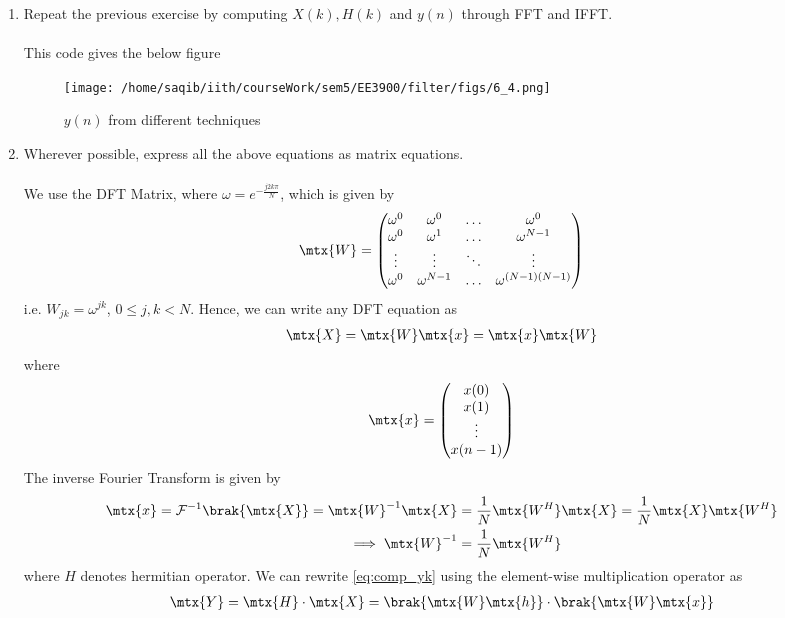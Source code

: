 \documentclass[journal,12pt,twocolumn]{IEEEtran}
\renewcommand\thesection{\arabic{section}}
\begin{document}
\begin{enumerate}[label=\thesection.\arabic*]
\item Repeat the previous exercise by computing $X(k), H(k)$ and $y(n)$ through FFT and 
IFFT.
\\\solution\\

This code gives the below figure
\begin{figure}[!ht]
	\centering
	\texttt{[image: /home/saqib/iith/courseWork/sem5/EE3900/filter/figs/6\_4.png]}
	\caption{$y(n)$ from different techniques}
	\label{fig:yndft}
	\end{figure}
\item Wherever possible, express all the above equations as matrix equations.
\\\solution\\
We use the DFT Matrix, where $\omega = e^{-\frac{j2k\pi}{N}}$, which is given by
\begin{align}
	\mtx{W} = 
	\begin{pmatrix}
		\omega^0 & \omega^0 & \ldots & \omega^0 \\
		\omega^0 & \omega^1 & \ldots & \omega^{N - 1} \\
		\vdots & \vdots & \ddots & \vdots \\
		\omega^0 & \omega^{N - 1} & \ldots & \omega^{(N -1)(N - 1)}
	\end{pmatrix}
\end{align}
i.e. $W_{jk} = \omega^{jk}$, $0 \leq j, k < N$. Hence, we can write any DFT equation as
\begin{align}
	\mtx{X} = \mtx{W}\mtx{x} = \mtx{x}\mtx{W}
\end{align}
\noindent where
\begin{align}
	\mtx{x} = 
	\begin{pmatrix}
		x(0) \\ x(1) \\ \vdots \\ x(n - 1)
	\end{pmatrix}
\end{align}
The inverse Fourier Transform is given by
\begin{align}
	\mtx{x} = \mathcal{F}^{-1}\brak{\mtx{X}} = \mtx{W}^{-1}\mtx{X} &= 
	\frac{1}{N}\mtx{W^{H}}\mtx{X} = \frac{1}{N}\mtx{X}\mtx{W^{H}} \\ 
	\implies \mtx{W}^{-1} &= \frac{1}{N}\mtx{W^{H}}
\end{align}
 where $H$ denotes hermitian operator. We can rewrite \eqref{eq:comp_yk} using the
element-wise multiplication operator as
\begin{align}
	\mtx{Y} = \mtx{H}\cdot\mtx{X} = \brak{\mtx{W}\mtx{h}}\cdot\brak{\mtx{W}\mtx{x}}
\end{align}


\end{enumerate}
\end{document}
